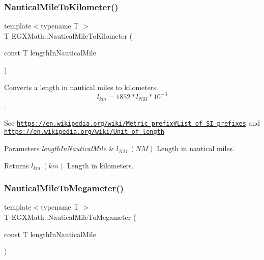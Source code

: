 \subsubsection{\texorpdfstring{Nautical\+Mile\+To\+Kilometer()}{NauticalMileToKilometer()}}
{\footnotesize\ttfamily template$<$typename T $>$ \\
T E\+G\+X\+Math\+::\+Nautical\+Mile\+To\+Kilometer (\begin{DoxyParamCaption}\item[{const T}]{length\+In\+Nautical\+Mile }\end{DoxyParamCaption})}



Converts a length in nautical miles to kilometers. \[ l_{km}=1852 * l_{NM} * 10^{-3} \]. 

See \href{https://en.wikipedia.org/wiki/Metric_prefix#List_of_SI_prefixes}{\tt https\+://en.\+wikipedia.\+org/wiki/\+Metric\+\_\+prefix\#\+List\+\_\+of\+\_\+\+S\+I\+\_\+prefixes} and \href{https://en.wikipedia.org/wiki/Unit_of_length}{\tt https\+://en.\+wikipedia.\+org/wiki/\+Unit\+\_\+of\+\_\+length} 
\begin{DoxyParams}{Parameters}
{\em length\+In\+Nautical\+Mile} & $ l_{NM}\ (NM)$ Length in nautical miles. \\
\hline
\end{DoxyParams}
\begin{DoxyReturn}{Returns}
$ l_{km}\ (km)$ Length in kilometers. 
\end{DoxyReturn}
\mbox{\label{group___e_g_x_math-_conversions-_length_conversions-_nautical-_nautical_mile-_s_i_gabd190340a7a220633ebf73e06cba7e1a}} 
\subsubsection{\texorpdfstring{Nautical\+Mile\+To\+Megameter()}{NauticalMileToMegameter()}}
{\footnotesize\ttfamily template$<$typename T $>$ \\
T E\+G\+X\+Math\+::\+Nautical\+Mile\+To\+Megameter (\begin{DoxyParamCaption}\item[{const T}]{length\+In\+Nautical\+Mile }\end{DoxyParamCaption})}



